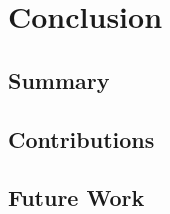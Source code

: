 
\chapter{Conclusion}
\label{ch:conclusion}

\section{Summary}
\label{sec:summary}


\section{Contributions}
\label{sec:final_contributions}


\section{Future Work}
\label{sec:future_work}

